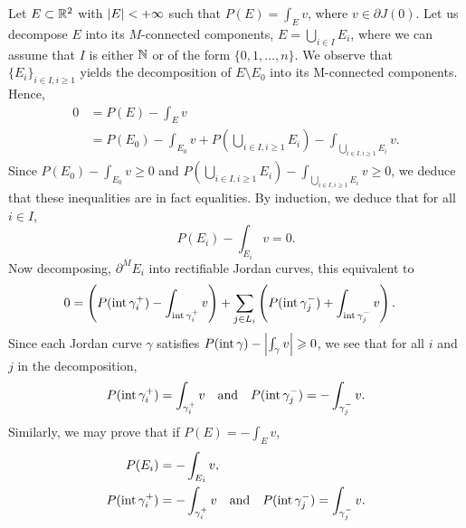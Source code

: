 \begin{rem}\label{rem:decomp}
  Let $E\subset \mathbb{R}^2$ with $\left| E \right|<+\infty$ such that $P(E)=\int_E v$, where $v\in \partial J(0)$. Let us decompose $E$ into its $M$-connected components, $E =\bigcup_{i\in I} E_{i}$, where we can assume that $I$ is either $\mathbb{N}$ or of the form $\{0, 1,\ldots, n\}$. We observe that $\{E_i\}_{i\in I, i\geq 1}$ yields the decomposition of $E\setminus E_0$ into its M-connected components. Hence,
\begin{align*}
  0&=  P(E)- \int_E v \\
   &= P(E_{0}) -\int_{E_{0}}v + P\left(\bigcup_{i\in I, i\geq 1} E_{i}\right)-\int_{\bigcup_{i\in I, i\geq 1} E_{i}}v.
\end{align*}
Since $P(E_{0}) -\int_{E_{0}}v\geq 0$ and $ P\left(\bigcup_{i\in I, i\geq 1} E_{i}\right)-\int_{\bigcup_{i\in I, i\geq 1} E_{i}}v\geq 0$, we deduce that these inequalities are in fact equalities. By induction, we deduce that for all $i\in I$,
\begin{equation*}
P(E_{i}) -\int_{E_{i}}v =0.
\end{equation*}
Now decomposing, $\partial^ME_{i}$ into rectifiable Jordan curves, this equivalent to 
\begin{align*}
0  &= \left(P(\operatorname{int} \gamma_i^+)-\int_{\operatorname{int} \gamma_i^+}v\right)  +\sum_{j\in L_i} \left(P(\operatorname{int} \gamma_j^-)+\int_{\operatorname{int} \gamma_j^-}v\right) .
\end{align*}
Since each Jordan curve $\gamma$ satisfies $P(\operatorname{int} \gamma)-\left| \int_{\gamma}v \right|\geqslant 0$, we see that for all $i$ and $j$ in the decomposition,
\begin{equation*}
  P(\operatorname{int} \gamma_i^+)=\int_{\gamma_i^+}v \quad \text{and} \quad P(\operatorname{int} \gamma_j^-)=-\int_{\gamma_j^-}v.
\end{equation*}
Similarly, we may prove that if $P(E)=-\int_E v$,
\begin{align*}
  P(E_i)&=-\int_{E_i}v,\\
  P(\operatorname{int} \gamma_i^+)&=-\int_{\gamma_i^+}v \quad \text{and} \quad P(\operatorname{int} \gamma_j^-)=\int_{\gamma_j^-}v.
\end{align*}
\end{rem}
